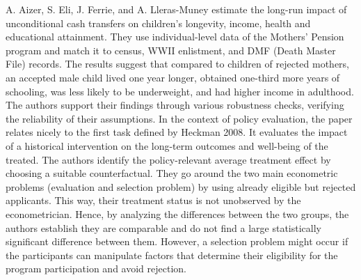 A. Aizer, S. Eli, J. Ferrie, and A. Lleras-Muney estimate the long-run
impact of unconditional cash transfers on children's longevity, income,
health and educational attainment. They use individual-level data of
the Mothers' Pension program and match it to census, WWII enlistment,
and DMF (Death Master File) records. The results suggest that compared
to children of rejected mothers, an accepted male child lived one year
longer, obtained one-third more years of schooling, was less likely to
be underweight, and had higher income in adulthood. The authors support their
findings through various robustness checks, verifying the reliability
of their assumptions. In the context of policy evaluation, the paper 
relates nicely to the first task defined by Heckman 2008. It evaluates the impact of a historical intervention on the long-term outcomes and well-being of the treated. The authors identify the policy-relevant average treatment effect by choosing a suitable counterfactual. They go around the two main econometric problems (evaluation and selection problem) by using already eligible but rejected applicants. This way, their treatment status is not unobserved by the econometrician. Hence, by analyzing the differences between the two groups, the authors establish they are comparable and do not find a large statistically significant difference between them. However, a selection problem might occur if the participants can manipulate factors that determine their eligibility for the program participation and avoid rejection.